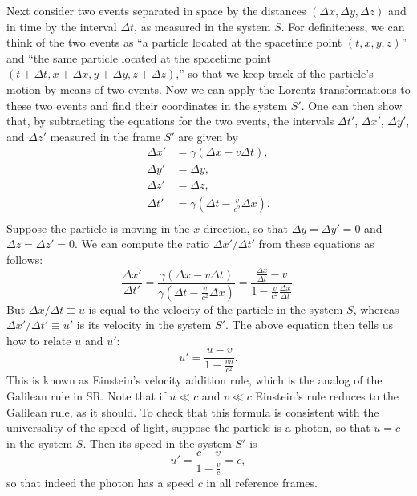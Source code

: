 \documentclass[11pt, a4paper,oneside,openright]{book}
\numberwithin{equation}{section}
\begin{document}
Next consider two events separated in space by the distances $(\Delta x,\Delta y,\Delta z)$ and in time by the interval $\Delta t$, as measured in the system $S$. For definiteness, we can think of the two events as ``a particle located at the spacetime point $(t,x,y,z)$'' and ``the same particle located at the spacetime point $(t+\Delta t,x+\Delta x,y+\Delta y,z+\Delta z)$,'' so that we keep track of the particle's motion by means of two events. Now we can apply the Lorentz transformations to these two events and find their coordinates in the system $S'$. One can then show that, by subtracting the equations for the two events, the intervals $\Delta t'$, $\Delta x'$, $\Delta y'$, and $\Delta z'$ measured in the frame $S'$ are given by
\begin{equation} \label{eq:lorentz_intervals}
\begin{split}
\Delta x'&=\gamma\left(\Delta x-v\Delta t\right),\\
\Delta y'&=\Delta y,\\
\Delta z'&=\Delta z,\\
\Delta t'&=\gamma\left(\Delta t-\frac{v}{c^2}\Delta x\right).\\
\end{split}
\end{equation}
Suppose the particle is moving in the $x$-direction, so that $\Delta y=\Delta y'=0$ and $\Delta z=\Delta z'=0$. We can compute the ratio $\Delta x'/\Delta  t'$ from these equations as follows:
\begin{equation}
\frac{\Delta x'}{\Delta t'}=\frac{\gamma\left(\Delta x-v\Delta t\right)}{\gamma\left(\Delta t-\frac{v}{c^2}\Delta x\right)}=\frac{\frac{\Delta x}{\Delta t}-v}{1-\frac{v}{c^2}\frac{\Delta x}{\Delta t}}.
\end{equation}
But $\Delta x/\Delta t\equiv u$ is equal to the velocity of the particle in the system $S$, whereas $\Delta x'/\Delta t'\equiv u'$ is its velocity in the system $S'$. The above equation then tells us how to relate $u$ and $u'$:
\begin{equation} \label{eq:einstein_vel_rule}
u'=\frac{u-v}{1-\frac{vu}{c^2}}.
\end{equation}
This is known as Einstein's velocity addition rule, which is the analog of the Galilean rule in SR. Note that if $u\ll c$ and $v\ll c$ Einstein's rule reduces to the Galilean rule, as it should. To check that this formula is consistent with the universality of the speed of light, suppose the particle is a photon, so that $u=c$ in the system $S$. Then its speed in the system $S'$ is
\begin{equation}
u'=\frac{c-v}{1-\frac{v}{c}}=c,
\end{equation}
so that indeed the photon has a speed $c$ in all reference frames.
\end{document}
